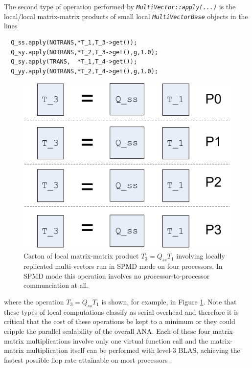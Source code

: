 \documentclass[pdf,ps2pdf,11pt]{SANDreport}
\begin{document}
The second type of operation performed by
{}\texttt{\textit{Multi\-Vector\-::apply(\-...)}} is the local/local
matrix-matrix products of small local
{}\texttt{\textit{Multi\-Vector\-Base}} objects in the lines

{\scriptsize\begin{verbatim}
  Q_ss.apply(NOTRANS,*T_1,T_3->get());
  Q_sy.apply(NOTRANS,*T_2,T_3->get(),g,1.0);
  Q_sy.apply(TRANS,  *T_1,T_4->get());
  Q_yy.apply(NOTRANS,*T_2,T_4->get(),g,1.0);
\end{verbatim}}

{\bsinglespace
\begin{figure}
\begin{center}
\includegraphics*[angle=0,scale=0.60]{figures/SPMD_Local_Matrix_Matrix_Prod_P4}
\end{center}
\caption{
\label{tsfcore:fig:SPMD_Local_Matrix_Matrix_Prod_P4}
Carton of local matrix-matrix product $T_3 = Q_{ss} T_1$ involving
locally replicated multi-vectors run in SPMD mode on four processors.
In SPMD mode this operation involves no processor-to-processor
communciation at all.}
\end{figure}
\esinglespace}

{}\noindent{}where the operation $T_3 = Q_{ss} T_1$ is shown, for
example, in Figure
{}\ref{tsfcore:fig:SPMD_Local_Matrix_Matrix_Prod_P4}.  Note that these
types of local computations classify as serial overhead and therefore
it is critical that the cost of these operations be kept to a minimum
or they could cripple the parallel scalability of the overall ANA.
Each of these four matrix-matrix multiplications involve only one
virtual function call and the matrix-matrix multiplication itself can
be performed with level-3 BLAS, achieving the fastest possible flop
rate attainable on most processors {}\cite{ref:demmel_1997}.
\end{document}
